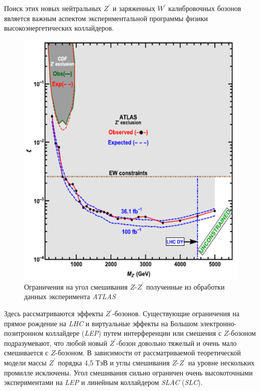 Поиск этих новых нейтральных ${Z}^{\prime}$ и заряженных ${W}^{\prime}$ калибровочных бозонов является важным аспектом экспериментальной программы физики высокоэнергетических коллайдеров. 

\begin{figure}[!h]
	\centering
	\includegraphics[width=\textwidth]{figures/verify-1.png}
	\caption{Ограничения на угол смешивания $Z$-${Z}^{\prime}$ полученные из обработки данных эксперимента \textit{ATLAS}~\cite{2part-pankov}}
	\label{fig:verify-1}
\end{figure}

Здесь рассматриваются  эффекты ${Z}^{\prime}$-бозонов. Существующие ограничения на прямое рождение на \textit{LHC} и виртуальные эффекты на Большом электронно-позитронном коллайдере (\textit{LEP}) путем интерференции или смешения с $Z$-бозоном подразумевают, что любой новый ${Z}^{\prime}$-бозон довольно тяжелый и очень мало смешивается с $Z$-бозоном. В зависимости от рассматриваемой теоретической модели массы ${Z}^{\prime}$ порядка 4,5 ТэВ и углы смешивания $Z$-${Z}^{\prime}$ на уровне нескольких промилле исключены. Угол смешивания сильно ограничен очень высокоточными экспериментами на \textit{LEP} и линейным коллайдером \textit{SLAC} (\textit{SLC}).

